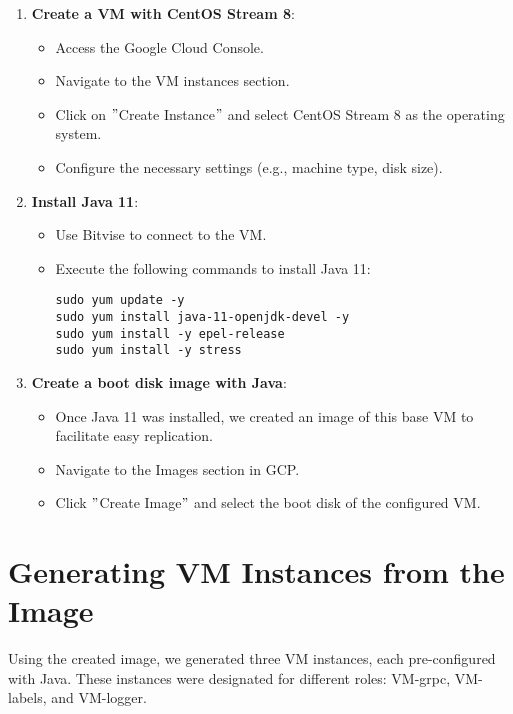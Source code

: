 \begin{enumerate}
    \item \textbf{Create a VM with CentOS Stream 8}:
    \begin{itemize}
        \item Access the Google Cloud Console.
        \item Navigate to the VM instances section.
        \item Click on \("\)Create Instance\("\) and select CentOS Stream 8 as the operating system.
        \item Configure the necessary settings (e.g., machine type, disk size).
    \end{itemize}

    \item \textbf{Install Java 11}:
    \begin{itemize}
        \item Use Bitvise to connect to the VM.
        \item Execute the following commands to install Java 11:
        \begin{verbatim}
sudo yum update -y
sudo yum install java-11-openjdk-devel -y
sudo yum install -y epel-release
sudo yum install -y stress
        \end{verbatim}
    \end{itemize}

    \item \textbf{Create a boot disk image with Java}:
    \begin{itemize}
        \item Once Java 11 was installed, we created an image of this base VM to facilitate easy replication.
        \item Navigate to the Images section in GCP.
        \item Click \("\)Create Image\("\) and select the boot disk of the configured VM.
    \end{itemize}
\end{enumerate}


\section{Generating VM Instances from the Image}\label{sec:generating-vm-instances-from-the-image}

Using the created image, we generated three VM instances, each pre-configured with Java. These instances were designated for different roles: VM-grpc, VM-labels, and VM-logger.

